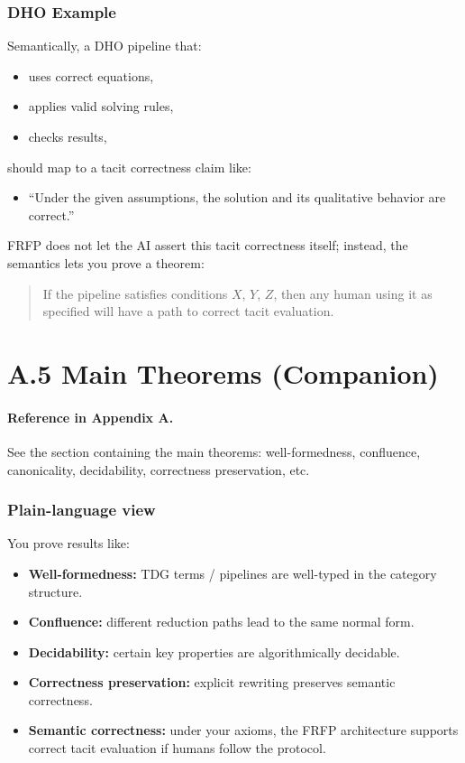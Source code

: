 \subsubsection*{DHO Example}

Semantically, a DHO pipeline that:

\begin{itemize}
 \item uses correct equations,
 \item applies valid solving rules,
 \item checks results,
\end{itemize}

should map to a tacit correctness claim like:

\begin{itemize}
 \item ``Under the given assumptions, the solution and its qualitative behavior are correct.''
\end{itemize}

FRFP does not let the AI assert this tacit correctness itself; instead, the semantics lets you prove 
a theorem:

\begin{quote}
If the pipeline satisfies conditions $X$, $Y$, $Z$, then any human using it as specified will have a
path to correct tacit evaluation.
\end{quote}

\newpage

\section{A.5 Main Theorems (Companion)}

\paragraph{Reference in Appendix A.}
See the section containing the main theorems: well-formedness, confluence, canonicality,
decidability, correctness preservation, etc.

\subsubsection*{Plain-language view}

You prove results like:

\begin{itemize}
 \item \textbf{Well-formedness:} TDG terms / pipelines are well-typed in the category structure.
 \item \textbf{Confluence:} different reduction paths lead to the same normal form.
 \item \textbf{Decidability:} certain key properties are algorithmically decidable.
 \item \textbf{Correctness preservation:} explicit rewriting preserves semantic correctness.
 \item \textbf{Semantic correctness:} under your axioms, the FRFP architecture supports correct
 tacit evaluation if humans follow the protocol.
\end{itemize}

